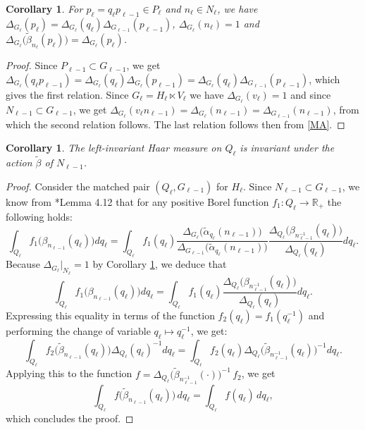 \documentclass[a4paper,11pt,reqno]{amsart}
\numberwithin{equation}{section}
\newtheorem{corollary}[theorem]{Corollary}
\theoremstyle{remark}
\theoremstyle{definition}
\newcommand{\R}{{\mathbb R}}
\begin{document}
  \begin{corollary}
  \label{C1L1}
For $p_\ell=q_\ell p_{\ell-1}\in P_\ell$ and $n_\ell\in N_\ell$,   we have
  $  \Delta_{G_\ell}(p_\ell)= \Delta_{G_\ell}(q_\ell)\Delta_{G_{\ell-1}}(p_{\ell-1})$,
  $\Delta_{G_\ell}(n_\ell)=1$ and $ \Delta_{G_\ell}\big(\tilde\beta_{n_\ell}(p_\ell)\big)= \Delta_{G_\ell}(p_\ell)$.
   \end{corollary}
  \begin{proof}
 Since $P_{\ell-1}\subset G_{\ell-1}$, we get
 $ \Delta_{G_\ell}(q_\ell p_{\ell-1})= \Delta_{G_\ell}(q_\ell)\Delta_{G_\ell}(p_{\ell-1})=\Delta_{G_\ell}(q_\ell)\Delta_{G_{\ell-1}}(p_{\ell-1})$,
 which gives the first relation.
Since $G_\ell=H_\ell\ltimes V_\ell$   we have $\Delta_{G_\ell}(v_\ell)=1$ and since $N_{\ell-1}\subset G_{\ell-1}$, we get
$ \Delta_{G_\ell}(v_\ell n_{\ell-1})
 =\Delta_{G_\ell}(n_{\ell-1})= \Delta_{G_{\ell-1}}(n_{\ell-1})$, from which the second relation follows.
 The last relation follows then from  \eqref{MA}.
 \end{proof}



  \begin{corollary}
  \label{C2L1}
 The left-invariant Haar measure on  $Q_\ell$ is invariant under the action $\tilde\beta$ of $N_{\ell-1}$.
 \end{corollary}
  \begin{proof}
   Consider  the matched pair $(Q_\ell,G_{\ell-1})$ for $H_\ell$. Since $N_{\ell-1}\subset G_{\ell-1}$, we know from  \cite{VV}*{Lemma 4.12}  that
 for any positive Borel function $f_1\colon Q_\ell\to\R_+$ the following holds:
$$
\int_{Q_\ell} f_1\big(\beta_{n_{\ell-1}}(q_\ell)\big) dq_\ell=
\int_{Q_\ell} f_1(q_\ell)\frac{\Delta_{G_\ell}\big(\tilde\alpha_{q_\ell}(n_{\ell-1})\big)} {\Delta_{G_{\ell-1}}\big(\tilde\alpha_{q_\ell}(n_{\ell-1})\big)}
\frac{\Delta_{Q_\ell}\big(\beta_{n_{\ell-1}^{-1}}(q_\ell)\big)}{\Delta_{Q_\ell}(q_\ell)}dq_\ell.
$$
Because $\Delta_{G_\ell} \big|_{N_\ell}=1$ by Corollary \ref{C1L1}, we deduce that
$$
\int_{Q_\ell} f_1\big(\beta_{n_{\ell-1}}(q_\ell)\big) dq_\ell=\int_{Q_\ell} f_1(q_\ell)
\frac{\Delta_{Q_\ell}\big(\beta_{n_{\ell-1}^{-1}}(q_\ell)\big)}{\Delta_{Q_\ell}(q_\ell)}dq_\ell.
$$
Expressing this equality in terms of the function $f_2(q_\ell)= f_1(q_\ell^{-1})$ and
performing the change of variable $q_\ell\mapsto q_\ell^{-1}$, we get:
$$
\int_{Q_\ell} f_2\big(\tilde\beta_{n_{\ell-1}}(q_\ell)\big) \Delta_{Q_\ell}(q_\ell)^{-1}dq_\ell=\int_{Q_\ell} f_2(q_\ell)
\Delta_{Q_\ell}\big(\tilde \beta_{n_{\ell-1}^{-1}}(q_\ell)\big)^{-1}dq_\ell .
$$
Applying this to the function $f= \Delta_{Q_\ell}\big(\tilde \beta_{n_{\ell-1}^{-1}}(\cdot)\big)^{-1}\, f_2$,
we get
$$
\int_{Q_\ell}f\big(\tilde\beta_{n_{\ell-1}}(q_\ell)\big)\,dq_\ell=\int_{Q_\ell} f(q_\ell)\,dq_\ell,
$$
which concludes the proof.
 \end{proof}
\end{document}
